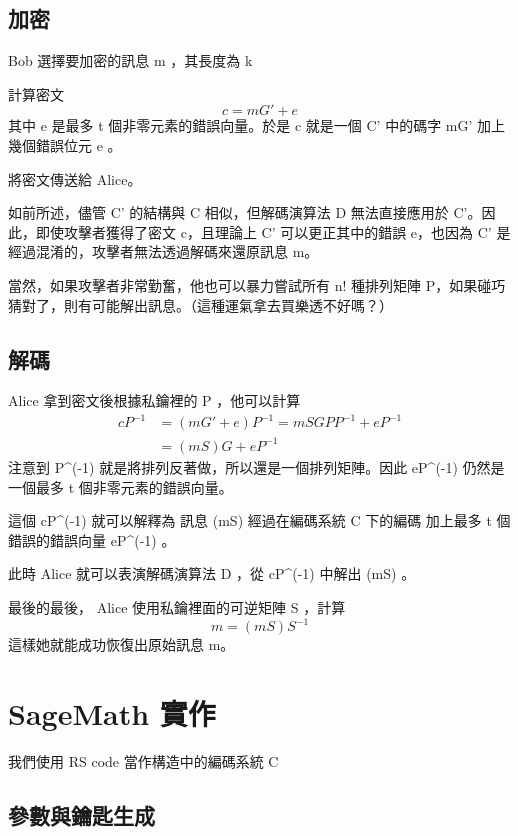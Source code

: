 \documentclass[
]{article}
\begin{document}
\hypertarget{ux52a0ux5bc6}{%
\subsection{加密}\label{ux52a0ux5bc6}}

Bob 選擇要加密的訊息 m ，其長度為 k

計算密文 \[
c = mG'  + e
\] 其中 e 是最多 t 個非零元素的錯誤向量。於是 c 就是一個 C' 中的碼字 mG'
加上幾個錯誤位元 e 。

將密文傳送給 Alice。

如前所述，儘管 C' 的結構與 C 相似，但解碼演算法 D 無法直接應用於
C'。因此，即使攻擊者獲得了密文 c，且理論上 C' 可以更正其中的錯誤
e，也因為 C' 是經過混淆的，攻擊者無法透過解碼來還原訊息 m。

當然，如果攻擊者非常勤奮，他也可以暴力嘗試所有 n! 種排列矩陣
P，如果碰巧猜對了，則有可能解出訊息。（這種運氣拿去買樂透不好嗎？）

\hypertarget{ux89e3ux78bc}{%
\subsection{解碼}\label{ux89e3ux78bc}}

Alice 拿到密文後根據私鑰裡的 P ，他可以計算 \[
\begin{aligned}
cP^{-1} &= (mG' + e)P^{-1} = m SGPP^{-1} + eP^{-1}\\
&=(mS)G + eP^{-1}
\end{aligned}
\] 注意到 P\^{}(-1) 就是將排列反著做，所以還是一個排列矩陣。因此
eP\^{}(-1) 仍然是一個最多 t 個非零元素的錯誤向量。

這個 cP\^{}(-1) 就可以解釋為 訊息 (mS) 經過在編碼系統 C 下的編碼
加上最多 t 個錯誤的錯誤向量 eP\^{}(-1) 。

此時 Alice 就可以表演解碼演算法 D ，從 cP\^{}(-1) 中解出 (mS) 。

最後的最後， Alice 使用私鑰裡面的可逆矩陣 S ，計算 \[
m = (mS) S^{-1}
\] 這樣她就能成功恢復出原始訊息 m。

\hypertarget{sagemath-ux5be6ux4f5c}{%
\section{SageMath 實作}\label{sagemath-ux5be6ux4f5c}}

我們使用 RS code 當作構造中的編碼系統 C

\hypertarget{ux53c3ux6578ux8207ux9470ux5319ux751fux6210}{%
\subsection{參數與鑰匙生成}\label{ux53c3ux6578ux8207ux9470ux5319ux751fux6210}}
\end{document}
